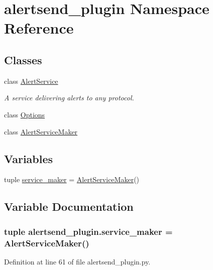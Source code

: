 \hypertarget{namespacealertsend__plugin}{\section{alertsend\-\_\-plugin Namespace Reference}
\label{namespacealertsend__plugin}
}
\subsection*{Classes}
\begin{DoxyCompactItemize}
\item 
class \hyperlink{classalertsend__plugin_1_1_alert_service}{Alert\-Service}
\begin{DoxyCompactList}\small\item\em A service delivering alerts to any protocol. \end{DoxyCompactList}\item 
class \hyperlink{classalertsend__plugin_1_1_options}{Options}
\item 
class \hyperlink{classalertsend__plugin_1_1_alert_service_maker}{Alert\-Service\-Maker}
\end{DoxyCompactItemize}
\subsection*{Variables}
\begin{DoxyCompactItemize}
\item 
tuple \hyperlink{namespacealertsend__plugin_a7778efeb37087a1f8a4d4c5e67b13378}{service\-\_\-maker} = \hyperlink{classalertsend__plugin_1_1_alert_service_maker}{Alert\-Service\-Maker}()
\end{DoxyCompactItemize}


\subsection{Variable Documentation}
\hypertarget{namespacealertsend__plugin_a7778efeb37087a1f8a4d4c5e67b13378}{
\subsubsection[{service\-\_\-maker}]{\setlength{\rightskip}{0pt plus 5cm}tuple alertsend\-\_\-plugin.\-service\-\_\-maker = {\bf Alert\-Service\-Maker}()}}\label{namespacealertsend__plugin_a7778efeb37087a1f8a4d4c5e67b13378}


Definition at line 61 of file alertsend\-\_\-plugin.\-py.

